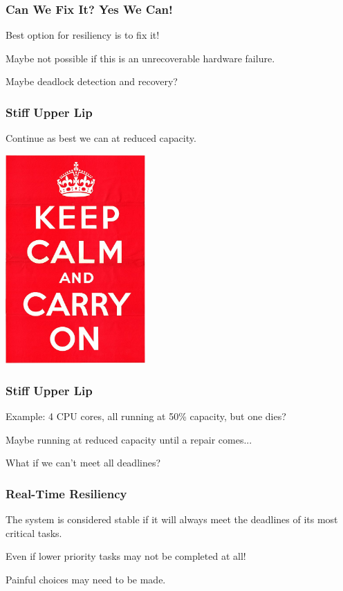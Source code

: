 \begin{frame}
\frametitle{Can We Fix It? Yes We Can!}

Best option for resiliency is to fix it!

Maybe not possible if this is an unrecoverable hardware failure.

Maybe deadlock detection and recovery?

\end{frame}

\begin{frame}
\frametitle{Stiff Upper Lip}

Continue as best we can at reduced capacity.

\begin{center}
	\includegraphics[width=0.4\textwidth]{images/keepcalm.jpg}
\end{center}

\end{frame}

\begin{frame}
\frametitle{Stiff Upper Lip}

Example: 4 CPU cores, all running at 50\% capacity, but one dies?

Maybe running at reduced capacity until a repair comes...

What if we can't meet all deadlines?

\end{frame}

\begin{frame}
\frametitle{Real-Time Resiliency}

The system is considered \alert{stable} if it will always meet the deadlines of its most critical tasks.

Even if lower priority tasks may not be completed at all!

Painful choices may need to be made.

\end{frame}

